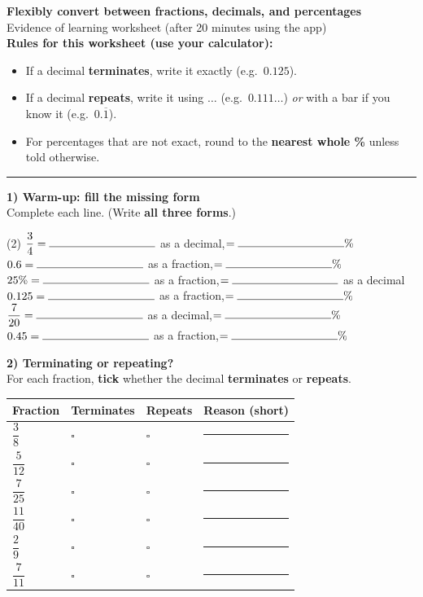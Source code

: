 \documentclass[12pt]{article}
\newcommand{\blank}{\rule{3.3cm}{0.4pt}}
\newcommand{\blanklong}{\rule{7.2cm}{0.4pt}}
\newcommand{\tickbox}{\(\square\)}
\newcommand{\overbar}[1]{\overline{#1}}
\begin{document}
\Large

{\LARGE \textbf{Flexibly convert between fractions, decimals, and percentages}}\\[2pt]
{\Large Evidence of learning worksheet (after 20 minutes using the app)}\\

\textbf{Rules for this worksheet (use your calculator):}
\begin{itemize}[itemsep=2pt,topsep=2pt]
\item If a decimal \textbf{terminates}, write it exactly (e.g.\ $0.125$).
\item If a decimal \textbf{repeats}, write it using \textbf{$\ldots$} (e.g.\ $0.111\ldots$) \textit{or} with a bar if you know it (e.g.\ $0.\overbar{1}$).
\item For percentages that are not exact, round to the \textbf{nearest whole \%} unless told otherwise.
\end{itemize}

\hrule
\vspace{6pt}

{\Large \textbf{1) Warm-up: fill the missing form}}\\
Complete each line. (Write \textbf{all three forms}.)\\[-2pt]
\begin{tasks}(2)
\task \( \dfrac{3}{4} = \blank \) as a decimal,\quad \(=\blank\%\)
\task \( 0.6 = \blank \) as a fraction,\quad \(=\blank\%\)
\task \( 25\% = \blank \) as a fraction,\quad \(=\blank \) as a decimal
\task \( 0.125 = \blank \) as a fraction,\quad \(=\blank\%\)
\task \( \dfrac{7}{20} = \blank \) as a decimal,\quad \(=\blank\%\)
\task \( 0.45 = \blank \) as a fraction,\quad \(=\blank\%\)
\end{tasks}

\vspace{4pt}
{\Large \textbf{2) Terminating or repeating?}}\\
For each fraction, \textbf{tick} whether the decimal \textbf{terminates} or \textbf{repeats}.\\[-2pt]
\renewcommand{\arraystretch}{1.4}
\begin{tabular}{|>{\centering\arraybackslash}m{2.6cm}|>{\centering\arraybackslash}m{3.3cm}|>{\centering\arraybackslash}m{3.3cm}|>{\arraybackslash}m{6.2cm}|}
\hline
\textbf{Fraction} & \textbf{Terminates} & \textbf{Repeats} & \textbf{Reason (short)}\\
\hline
\(\dfrac{3}{8}\)  & \tickbox & \tickbox & \blanklong\\ \hline
\(\dfrac{5}{12}\) & \tickbox & \tickbox & \blanklong\\ \hline
\(\dfrac{7}{25}\) & \tickbox & \tickbox & \blanklong\\ \hline
\(\dfrac{11}{40}\)& \tickbox & \tickbox & \blanklong\\ \hline
\(\dfrac{2}{9}\)  & \tickbox & \tickbox & \blanklong\\ \hline
\(\dfrac{7}{11}\) & \tickbox & \tickbox & \blanklong\\ \hline
\end{tabular}
\end{document}
